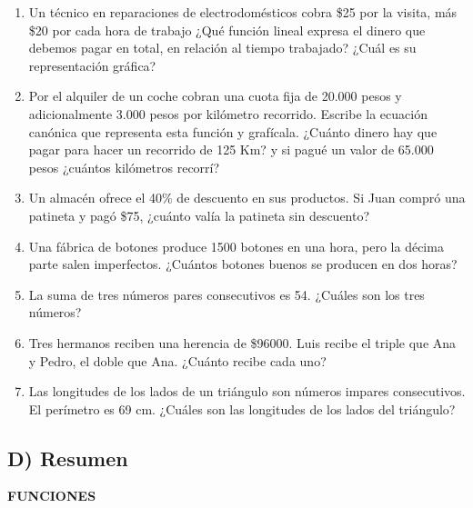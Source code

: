 \documentclass[12pt,a4paper]{article}
\begin{document}
\begin{enumerate}
\item Un técnico en reparaciones de electrodomésticos cobra \$25 por la visita, más \$20 por cada hora de trabajo ¿Qué función lineal expresa el dinero que debemos pagar en total, en relación al tiempo trabajado? ¿Cuál es su representación gráfica?

\item Por el alquiler de un coche cobran una cuota fija de 20.000 pesos y adicionalmente 3.000 pesos por kilómetro recorrido. Escribe la ecuación canónica que representa esta función y grafícala. ¿Cuánto dinero hay que pagar para hacer un recorrido de 125 Km? y si pagué un valor de 65.000 pesos ¿cuántos kilómetros recorrí?

\item Un almacén ofrece el 40\% de descuento en sus productos. Si Juan compró una patineta y pagó \$75, ¿cuánto valía la patineta sin descuento?

\item Una fábrica de botones produce 1500 botones en una hora, pero la décima parte salen imperfectos. ¿Cuántos botones buenos se producen en dos horas?

\item La suma de tres números pares consecutivos es 54. ¿Cuáles son los tres números?

\item Tres hermanos reciben una herencia de \$96000. Luis recibe el triple que Ana y Pedro, el doble que Ana. ¿Cuánto recibe cada uno?

\item Las longitudes de los lados de un triángulo son números impares consecutivos. El perímetro es 69 cm. ¿Cuáles son las longitudes de los lados del triángulo?
\end{enumerate}

\vspace{5mm}


\subsection*{D) Resumen}

\begin{center}
\textbf{FUNCIONES}
\end{center}
\end{document}

